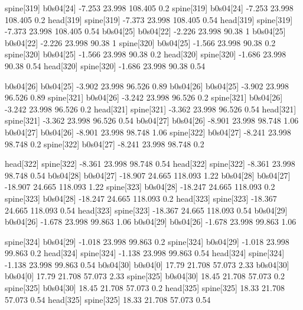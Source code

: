 spine[319]    b0s04[24]    -7.253    23.998    108.405    0.2
spine[319]    b0s04[24]    -7.253    23.998    108.405    0.2
head[319]    spine[319]    -7.373    23.998    108.405    0.54
head[319]    spine[319]    -7.373    23.998    108.405    0.54
b0s04[25]    b0s04[22]    -2.226    23.998    90.38    1
b0s04[25]    b0s04[22]    -2.226    23.998    90.38    1
spine[320]    b0s04[25]    -1.566    23.998    90.38    0.2
spine[320]    b0s04[25]    -1.566    23.998    90.38    0.2
head[320]    spine[320]    -1.686    23.998    90.38    0.54
head[320]    spine[320]    -1.686    23.998    90.38    0.54


b0s04[26]    b0s04[25]    -3.902    23.998    96.526    0.89
b0s04[26]    b0s04[25]    -3.902    23.998    96.526    0.89
spine[321]    b0s04[26]    -3.242    23.998    96.526    0.2
spine[321]    b0s04[26]    -3.242    23.998    96.526    0.2
head[321]    spine[321]    -3.362    23.998    96.526    0.54
head[321]    spine[321]    -3.362    23.998    96.526    0.54
b0s04[27]    b0s04[26]    -8.901    23.998    98.748    1.06
b0s04[27]    b0s04[26]    -8.901    23.998    98.748    1.06
spine[322]    b0s04[27]    -8.241    23.998    98.748    0.2
spine[322]    b0s04[27]    -8.241    23.998    98.748    0.2


head[322]    spine[322]    -8.361    23.998    98.748    0.54
head[322]    spine[322]    -8.361    23.998    98.748    0.54
b0s04[28]    b0s04[27]    -18.907    24.665    118.093    1.22
b0s04[28]    b0s04[27]    -18.907    24.665    118.093    1.22
spine[323]    b0s04[28]    -18.247    24.665    118.093    0.2
spine[323]    b0s04[28]    -18.247    24.665    118.093    0.2
head[323]    spine[323]    -18.367    24.665    118.093    0.54
head[323]    spine[323]    -18.367    24.665    118.093    0.54
b0s04[29]    b0s04[26]    -1.678    23.998    99.863    1.06
b0s04[29]    b0s04[26]    -1.678    23.998    99.863    1.06


spine[324]    b0s04[29]    -1.018    23.998    99.863    0.2
spine[324]    b0s04[29]    -1.018    23.998    99.863    0.2
head[324]    spine[324]    -1.138    23.998    99.863    0.54
head[324]    spine[324]    -1.138    23.998    99.863    0.54
b0s04[30]    b0s04[0]    17.79    21.708    57.073    2.33
b0s04[30]    b0s04[0]    17.79    21.708    57.073    2.33
spine[325]    b0s04[30]    18.45    21.708    57.073    0.2
spine[325]    b0s04[30]    18.45    21.708    57.073    0.2
head[325]    spine[325]    18.33    21.708    57.073    0.54
head[325]    spine[325]    18.33    21.708    57.073    0.54


